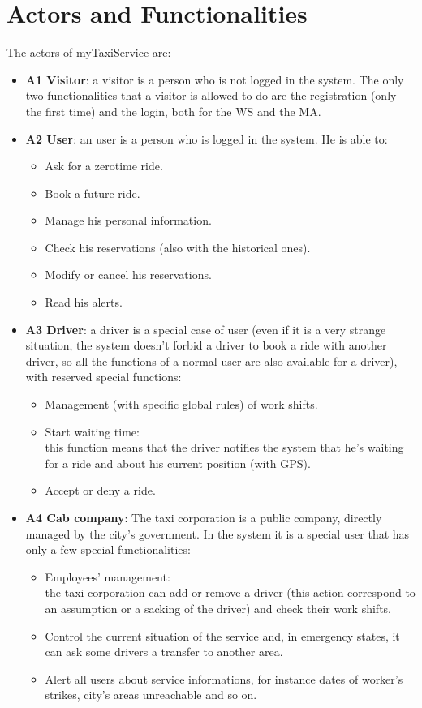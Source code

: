 \section{Actors and Functionalities}
The actors of myTaxiService are:
\begin{itemize}
	
	\item \textbf{A1 Visitor}: a visitor is a person who is not logged in the system. The only two functionalities that a visitor is allowed to do are the registration (only the first time) and the login, both for the WS and the MA.
	
	\item \textbf{A2 User}: an user is a person who is logged in the system. He is able to:
	\begin{itemize}
		\item Ask for a zerotime ride.
		\item Book a future ride.
		\item Manage his personal information.
		\item Check his reservations (also with the historical ones).
		\item Modify or cancel his reservations.
		\item Read his alerts.
	\end{itemize}
	
	\item \textbf{A3 Driver}: a driver is a special case of user (even if it is a very strange situation, the system doesn't forbid a driver to book a ride with another driver, so all the functions of a normal user are also available for a driver), with reserved special functions:
	\begin{itemize}
		\item Management (with specific global rules) of work shifts.
		\item Start waiting time:\\
		this function means that the driver notifies the system that he's waiting for a ride and about his current position (with GPS). 	
		\item Accept or deny a ride.
	\end{itemize}
	
	\item \textbf{A4 Cab company}: The taxi corporation is a public company, directly managed by the city's government. In the system it is a special user that has only a few special functionalities:
	\begin{itemize}
		\item Employees' management:\\
		the taxi corporation can add or remove a driver (this action correspond to an assumption or a sacking of the driver) and check their work shifts.
		\item Control the current situation of the service and, in emergency states, it can ask some drivers a transfer to another area.
		\item Alert all users about service informations, for instance dates of worker's strikes, city's areas unreachable and so on.
	\end{itemize}
	

\end{itemize}
